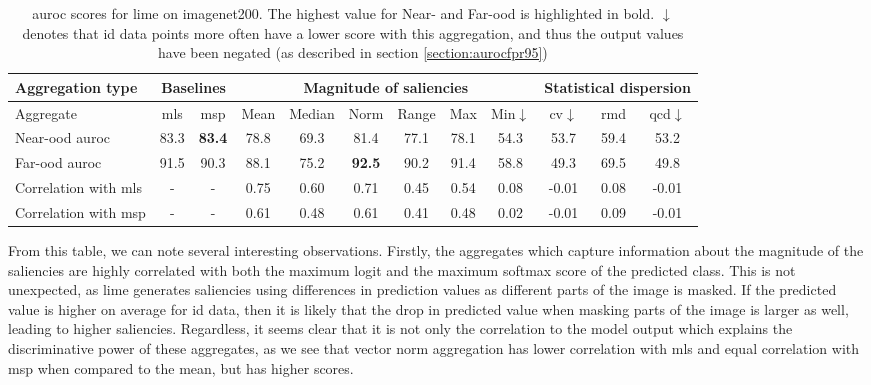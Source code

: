 \documentclass[UKenglish]{uiomasterthesis} %
\theoremstyle{definition}
\begin{document}
\begin{table}[H]
\setlength\tabcolsep{3pt}
\begin{center}
\begin{tabular}{ |m{5em}|c c|c c c c c c|c c c| }
    \hline
    \centering Aggregation type & \multicolumn{2}{c|}{Baselines} & \multicolumn{6}{c|}{Magnitude of saliencies} & \multicolumn{3}{p{8em}|}{\centering Statistical dispersion} \\
    \hline
     Aggregate & \ac{mls} & \ac{msp} & Mean & Median & Norm & Range & Max & Min$\downarrow$ & \ac{cv}$\downarrow$ & \ac{rmd} & \ac{qcd}$\downarrow$  \\
    \hline
    \rowcolor{near!50}
    Near-\ac{ood} \ac{auroc} & 83.3 &\textbf{ 83.4 }& 78.8 & 69.3 & 81.4 & 77.1 & 78.1 & 54.3 & 53.7 & 59.4 & 53.2  \\
    \hline
    \rowcolor{far!50}
    Far-\ac{ood} \ac{auroc} & 91.5 & 90.3 & 88.1 & 75.2 &\textbf{ 92.5 }& 90.2 & 91.4 & 58.8 & 49.3 & 69.5 & 49.8  \\
    \hline
    Correlation with \ac{mls}& - & - & 0.75 & 0.60 & 0.71 & 0.45 & 0.54 & 0.08 & -0.01 & 0.08 & -0.01  \\
    \hline
    Correlation with \ac{msp}& - & - & 0.61 & 0.48 & 0.61 & 0.41 & 0.48 & 0.02 & -0.01 & 0.09 & -0.01  \\
    \hline
    \end{tabular}
    \caption{\ac{auroc} scores for lime on imagenet200. The highest value for Near- and Far-\ac{ood} is highlighted in bold. $\downarrow$ denotes that \ac{id} data points more often have a lower score with this aggregation, and thus the output values have been negated (as described in section \ref{section:aurocfpr95})}
    \label{table:imagenet200_lime_metrics}
\end{center}
\setlength\tabcolsep{6pt}
\end{table}

From this table, we can note several interesting observations. Firstly, the aggregates which capture information about the magnitude of the saliencies are highly correlated with both the maximum logit and the maximum softmax score of the predicted class. This is not unexpected, as \ac{lime} generates saliencies using differences in prediction values as different parts of the image is masked. If the predicted value is higher on average for \ac{id} data, then it is likely that the drop in predicted value when masking parts of the image is larger as well, leading to higher saliencies. Regardless, it seems clear that it is not only the correlation to the model output which explains the discriminative power of these aggregates, as we see that vector norm aggregation has lower correlation with \ac{mls} and equal correlation with \ac{msp} when compared to the mean, but has higher scores.
\end{document}
